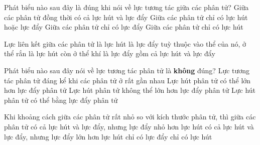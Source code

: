 \begin{ex}
	Phát biểu nào sau đây là đúng khi nói về lực tương tác giữa các phân tử?
	\choice
	{\True Giữa các phân tử đồng thời có cả lực hút và lực đẩy}
	{Giữa các phân tử chỉ có lực hút hoặc lực đẩy}
	{Giữa các phân tử chỉ có lực đẩy}
	{Giữa các phân tử chỉ có lực hút}
	\end{ex}

\begin{ex}
	Lực liên kết giữa các phân tử	
	\choice
	{là lực hút}
	{là lực đẩy}
	{tuỳ thuộc vào thể của nó, ở thể rắn là lực hút còn ở thể khí là lực đẩy}
	{\True gồm cả lực hút và lực đẩy}
	\end{ex}



\begin{ex}%
	Phát biểu nào sau đây nói về lực tương tác phân tử là \textbf{không} đúng?
	\choice
	{Lực tương tác phân tử đáng kể khi các phân tử ở rất gần nhau}
	{Lực hút phân tử có thể lớn hơn lực đẩy phân tử}
	{\True Lực hút phân tử không thể lớn hơn lực đẩy phân tử}
	{Lực hút phân tử có thể bằng lực đẩy phân tử}
	\end{ex}
\newpage 
\begin{ex} %
	Khi khoảng cách giữa các phân tử rất nhỏ so với kích thước phân tử, thì giữa các phân tử
	\choice
	{có cả lực hút và lực đẩy, nhưng lực đẩy nhỏ hơn lực hút}
	{\True có cả lực hút và lực đẩy, nhưng lực đẩy lớn hơn lực hút}
	{chỉ có lực đẩy}
	{chỉ có lực hút}	
	\end{ex}



